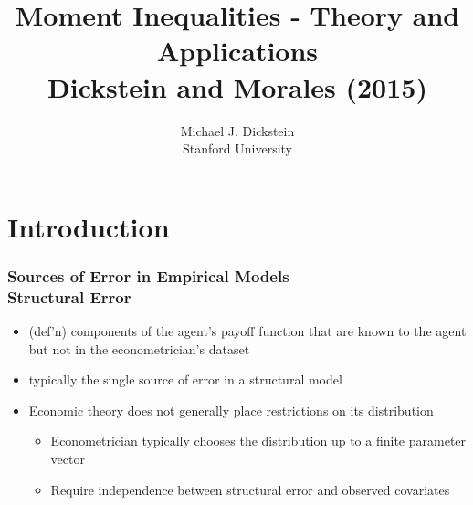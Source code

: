 \documentclass[10pt,letterpaper]{beamer}
\begin{document}
\title[Moment Inequalities]{Moment Inequalities - Theory and Applications\\
Dickstein and Morales (2015)}
\author[MJ Dickstein]{Michael J. Dickstein \\
Stanford University}


\begin{frame}
\titlepage
\end{frame}


\section{Introduction}


\begin{frame}
\frametitle{{Sources of Error in Empirical Models}\\{Structural Error}}

\begin{itemize}
\item (def'n) components of the agent's payoff function that are known to
the agent but not in the econometrician's dataset

\item typically the single source of error in a structural model

\item Economic theory does not generally place restrictions on its
distribution

\begin{itemize}
\item Econometrician typically chooses the distribution up to a finite
parameter vector 

\item Require independence between structural error and observed covariates
\end{itemize}
\end{itemize}
\end{frame}
\end{document}
